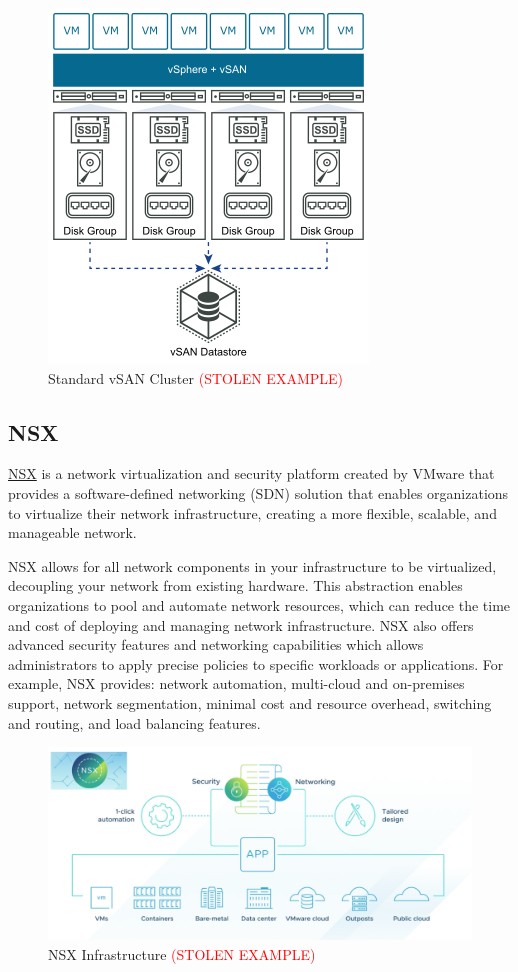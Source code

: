 \begin{figure}[H]
    \centering
    \includegraphics[scale = .8]{images/vsan-deployment.png}
    \caption{Standard vSAN Cluster \textcolor{red}{(STOLEN EXAMPLE)} }
    \label{vSan}
\end{figure}

\subsection{NSX}
\href{https://docs.vmware.com/en/VMware-NSX/index.html}{NSX} is a network virtualization and security platform created by VMware that provides a software-defined networking (SDN) solution that enables organizations to virtualize their network infrastructure, creating a more flexible, scalable, and manageable network.

NSX allows for all network components in your infrastructure to be virtualized, decoupling your network from existing hardware. This abstraction enables organizations to pool and automate network resources, which can reduce the time and cost of deploying and managing network infrastructure. NSX also offers advanced security features and networking capabilities which allows administrators to apply precise policies to specific workloads or applications. For example, NSX provides: network automation, multi-cloud and on-premises support, network segmentation, minimal cost and resource overhead, switching and routing, and load balancing features. 

\begin{figure}[H]
    \centering
    \includegraphics[scale = .19]{images/nsx-diagram.png}
    \caption{NSX Infrastructure \textcolor{red}{(STOLEN EXAMPLE)} }
    \label{NSX}
\end{figure}

